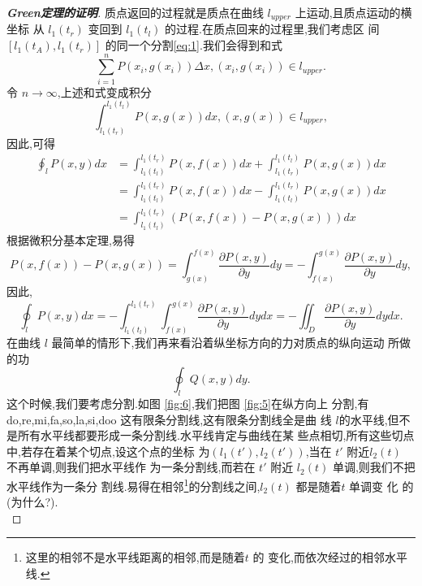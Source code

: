 \documentclass[twoside,11pt]{article}
\newcommand{\pa}{\partial} \newcommand{\Om}{\Omega}
\begin{document}
\begin{proof}[\bf{Green定理的证明}]
质点返回的过程就是质点在曲线 $l_{upper}$ 上运动,且质点运动的横坐标
从 $l_1(t_r)$ 变回到 $l_1(t_l)$ 的过程.在质点回来的过程里,我们考虑区
间 $[l_1(t_A),l_1(t_r)]$ 的同一个分割\eqref{eq:1}.我们会得到和式
$$
\sum_{i=1}^nP(x_{i},g(x_{i}))\Delta x,(x_{i},g(x_{i}))\in l_{upper}.
$$
令 $n\to\infty$,上述和式变成积分
$$
\int_{l_1(t_r)}^{l_1(t_l)}P(x,g(x))dx,(x,g(x))\in l_{upper},
$$
因此,可得
\begin{align*}
  \oint_lP(x,y)dx&=\int_{l_1(t_l)}^{l_1(t_r)}P(x,f(x))dx+\int_{l_1(t_r)}^{l_1(t_l)}P(x,g(x))dx\\&=\int_{l_1(t_l)}^{l_1(t_r)}P(x,f(x))dx-\int_{l_1(t_l)}^{l_1(t_r)}P(x,g(x))dx\\&=\int_{l_1(t_l)}^{l_1(t_r)}(P(x,f(x))-P(x,g(x)))dx
\end{align*}
根据微积分基本定理,易得
$$
P(x,f(x))-P(x,g(x))= \int_{g(x)}^{f(x)}\frac{\pa P(x,y)}{\pa
  y}dy=-\int_{f(x)}^{g(x)}\frac{\pa P(x,y)}{\pa y}dy,
$$
因此,
$$
\oint_lP(x,y)dx=-\int_{l_1(t_l)}^{l_1(t_r)}\int_{f(x)}^{g(x)}\frac{\pa
  P(x,y)}{\pa y}dydx=-\iint_D \frac{\pa P(x,y)}{\pa y}dydx.
$$
在曲线 $l$ 最简单的情形下,我们再来看沿着纵坐标方向的力对质点的纵向运动
所做的功
$$
\oint_lQ(x,y)dy.
$$
这个时候,我们要考虑分割.如图 \ref{fig:6},我们把图 \ref{fig:5}在纵方向上
分割,有 do,re,mi,fa,so,la,si,doo 这有限条分割线,这有限条分割线全是曲
线 $l$的水平线,但不是所有水平线都要形成一条分割线.水平线肯定与曲线在某
些点相切,所有这些切点中,若存在着某个切点,设这个点的坐标
为$(l_1(t'),l_2(t'))$,当在 $t'$ 附近$l_2(t)$ 不再单调,则我们把水平线作
为一条分割线,而若在 $t'$ 附近 $l_2(t)$ 单调,则我们不把水平线作为一条分
割线.易得在相邻\footnote{这里的相邻不是水平线距离的相邻,而是随着$t$ 的
  变化,而依次经过的相邻水平线.}的分割线之间,$l_2(t)$ 都是随着$t$ 单调变
化
的(为什么?).\\


\end{proof}
\end{document}
